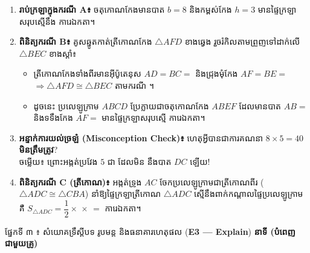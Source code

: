 \documentclass[a4paper,10pt]{article}
\newcommand{\en}[1]{{\TimesEn #1}}
\newcommand{\enbf}[1]{{\TimesEn\bfseries #1}}
\newcommand{\blank}[1]{\makebox[#1]{\dotfill}}
\newcommand{\tri}[1]{\ensuremath{\triangle #1}}
\newcommand{\cg}{\ensuremath{\cong}}
\newcommand{\secbar}[2]{%
  \begin{tcolorbox}[
    enhanced, sharp corners, colback=headgray, colframe=black,
    boxrule=1.0pt, boxsep=1pt, top=2.5pt, bottom=2.5pt, left=6pt, right=6pt,
    before skip=4pt, after skip=3.5pt
  ]
    {\muol\fontsize{9.2pt}{13.5pt}\selectfont #1}\hfill{\fontsize{8.3pt}{11.5pt}\selectfont\textbf{#2}}
  \end{tcolorbox}%
}
\begin{document}
\vspace{2pt}
\begin{enumerate}[label=\textbf{\arabic*.}, leftmargin=1.5em, itemsep=3pt, topsep=2pt]
  \item \textbf{រាប់ក្រឡាក្នុងករណី A៖} ចតុកោណកែងមានបាត $b = 8$ និងកម្ពស់កែង $h = 3$ មានផ្ទៃក្រឡាសរុបស្មើនឹង \blank{1.8cm} ការេឯកតា។
  \item \textbf{ពិនិត្យករណី B៖} គូសឆ្នូតកាត់ត្រីកោណកែង $\tri{AFD}$ ខាងឆ្វេង រួចរំកិលតាមព្រួញទៅដាក់លើ $\tri{BEC}$ ខាងស្ដាំ៖
  \begin{itemize}[leftmargin=1.3em, itemsep=2pt, topsep=1pt]
    \item ត្រីកោណកែងទាំងពីរមានអ៊ីប៉ូតេនុស $AD = BC =$ \blank{1.3cm} និងជ្រុងមុំកែង $AF = BE =$ \blank{1.3cm} $\Rightarrow \tri{AFD} \cg \tri{BEC}$ តាមករណី \blank{1.6cm}។
    \item ដូចនេះ ប្រលេឡូក្រាម $ABCD$ ប្រែក្លាយជាចតុកោណកែង $ABEF$ ដែលមានបាត $AB =$ \blank{1.3cm} និងទទឹងកែង $AF =$ \blank{1.3cm} មានផ្ទៃក្រឡាសរុបស្មើ \blank{1.6cm} ការេឯកតា។
  \end{itemize}
  \item \textbf{អន្ទាក់ការយល់ច្រឡំ (\en{Misconception Check})៖} ហេតុអ្វីបានជាការគណនា $8 \times 5 = 40$ \textbf{មិនត្រឹមត្រូវ}?\\
  ចម្លើយ៖ ព្រោះអង្កត់ប្រវែង $5$ ជា \blank{3.2cm} ដែលមិន \blank{2.8cm} នឹងបាត $DC$ ឡើយ!
  \item \textbf{ពិនិត្យករណី C (ត្រីកោណ)៖} អង្កត់ទ្រូង $AC$ ចែកប្រលេឡូក្រាមជាត្រីកោណពីរ \blank{2.6cm} ($\tri{ADC} \cg \tri{CBA}$) នាំឱ្យផ្ទៃក្រឡាត្រីកោណ $\tri{ADC}$ ស្មើនឹងពាក់កណ្ដាលផ្ទៃប្រលេឡូក្រាម គឺ $S_{\tri{ADC}} = \dfrac{1}{2} \times$ \blank{1.3cm} $\times$ \blank{1.3cm} $=$ \blank{1.6cm} ការេឯកតា។
\end{enumerate}

\secbar{ផ្នែកទី ៣ ៖ សំយោគទ្រឹស្ដីបទ រូបមន្ត និងធនាគារហេតុផល (\enbf{E3 — Explain})}{\en{6} នាទី (បំពេញជាមួយគ្រូ)}
\end{document}
